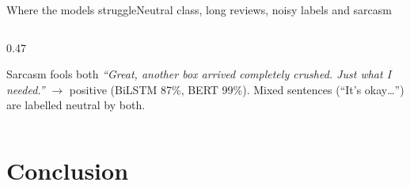\documentclass[aspectratio=169,10pt]{beamer}
\begin{document}
\begin{frame}{Where the models struggle}{Neutral class, long reviews, noisy labels and sarcasm}
\begin{columns}[T]
\begin{column}{0.47\textwidth}
      \begin{alertblock}{Sarcasm fools both}
        \emph{``Great, another box arrived completely crushed. Just what I needed.''} $\to$ positive (BiLSTM 87\%, BERT 99\%). Mixed sentences (``It's okay\ldots'') are labelled neutral by both.
      \end{alertblock}
    \end{column}
  \end{columns}
\end{frame}

\section{Conclusion}
\end{document}

